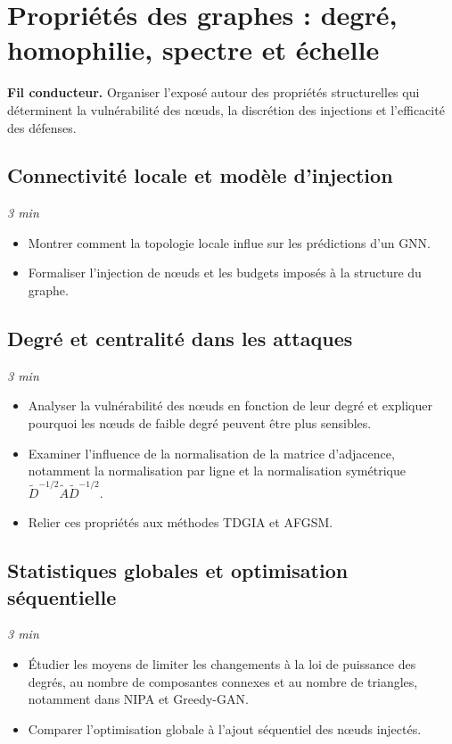 \documentclass[11pt,a4paper]{article}
\newcommand{\duree}[1]{\hfill\textit{#1}}
\begin{document}
\section{Propriétés des graphes : degré, homophilie, spectre et échelle}

\textbf{Fil conducteur.} Organiser l'exposé autour des propriétés structurelles
qui déterminent la vulnérabilité des nœuds, la discrétion des injections et
l'efficacité des défenses.

\subsection{Connectivité locale et modèle d'injection}\duree{3 min}
\begin{itemize}
    \item Montrer comment la topologie locale influe sur les prédictions d'un
    GNN.
    \item Formaliser l'injection de nœuds et les budgets imposés à la structure
    du graphe.
\end{itemize}

\subsection{Degré et centralité dans les attaques}\duree{3 min}
\begin{itemize}
    \item Analyser la vulnérabilité des nœuds en fonction de leur degré et
    expliquer pourquoi les nœuds de faible degré peuvent être plus sensibles.
    \item Examiner l'influence de la normalisation de la matrice d'adjacence,
    notamment la normalisation par ligne et la normalisation symétrique
    $\tilde{D}^{-1/2}\tilde{A}\tilde{D}^{-1/2}$.
    \item Relier ces propriétés aux méthodes TDGIA et AFGSM.
\end{itemize}

\subsection{Statistiques globales et optimisation séquentielle}\duree{3 min}
\begin{itemize}
    \item Étudier les moyens de limiter les changements à la loi de puissance
    des degrés, au nombre de composantes connexes et au nombre de triangles,
    notamment dans NIPA et Greedy-GAN.
    \item Comparer l'optimisation globale à l'ajout séquentiel des nœuds
    injectés.
\end{itemize}
\end{document}
